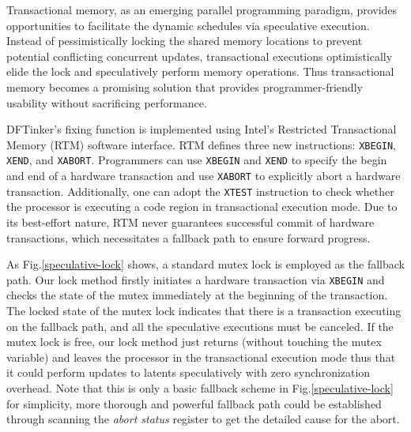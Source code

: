 \documentclass[10pt]{llncs}
\begin{document}
Transactional memory, as an emerging parallel programming paradigm, provides opportunities to facilitate the dynamic schedules via speculative execution. Instead of pessimistically locking the shared memory locations to prevent potential conflicting concurrent updates, transactional executions optimistically elide the lock and speculatively perform memory operations. Thus transactional memory becomes a promising solution that provides programmer-friendly usability without sacrificing performance.

DFTinker's fixing function is implemented using Intel's Restricted Transactional Memory (RTM) software interface. RTM defines three new instructions: \verb:XBEGIN:, \verb:XEND:, and \verb:XABORT:. Programmers can use \verb:XBEGIN: and \verb:XEND: to specify the begin and end of a hardware transaction and use \verb:XABORT: to explicitly abort a hardware transaction. Additionally, one can adopt the \verb:XTEST: instruction to check whether the processor is executing a code region in transactional execution mode. Due to its best-effort nature, RTM never guarantees successful commit of hardware transactions, which necessitates a fallback path to ensure forward progress.




As Fig.\ref{speculative-lock} shows, a standard mutex lock is employed as the fallback path. 
Our lock method firstly initiates a hardware transaction via \verb:XBEGIN: and checks the state of the mutex immediately at the beginning of the transaction. The locked state of the mutex lock indicates that there is a transaction executing on the fallback path, and all the speculative executions must be canceled. 
If the mutex lock is free, our lock method just returns (without touching the mutex variable) and leaves the processor in the transactional execution mode thus that it could perform updates to latents speculatively with zero synchronization overhead. 
Note that this is only a basic fallback scheme in Fig.\ref{speculative-lock} for simplicity, 
more thorough and powerful fallback path could be established through scanning the \textit{abort status} register to get the detailed cause for the abort. 
\end{document}
